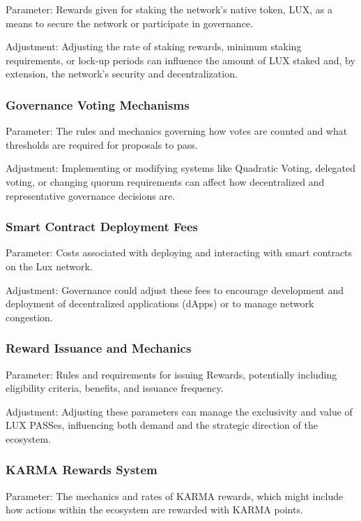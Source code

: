 \documentclass[11pt]{article}
\begin{document}
Parameter: Rewards given for staking the network's native token, LUX, as a means to secure the network or participate in governance.


Adjustment: Adjusting the rate of staking rewards, minimum staking requirements, or lock-up periods can influence the amount of LUX staked and, by extension, the network's security and decentralization.


\subsubsection{Governance Voting Mechanisms}

Parameter: The rules and mechanics governing how votes are counted and what thresholds are required for proposals to pass.


Adjustment: Implementing or modifying systems like Quadratic Voting, delegated voting, or changing quorum requirements can affect how decentralized and representative governance decisions are.


\subsubsection{Smart Contract Deployment Fees}

Parameter: Costs associated with deploying and interacting with smart contracts on the Lux network.


Adjustment: Governance could adjust these fees to encourage development and deployment of decentralized applications (dApps) or to manage network congestion.


\subsubsection{Reward Issuance and Mechanics}

Parameter: Rules and requirements for issuing Rewards, potentially including eligibility criteria, benefits, and issuance frequency.


Adjustment: Adjusting these parameters can manage the exclusivity and value of LUX PASSes, influencing both demand and the strategic direction of the ecosystem.


\subsubsection{KARMA Rewards System}

Parameter: The mechanics and rates of KARMA rewards, which might include how actions within the ecosystem are rewarded with KARMA points.
\end{document}
